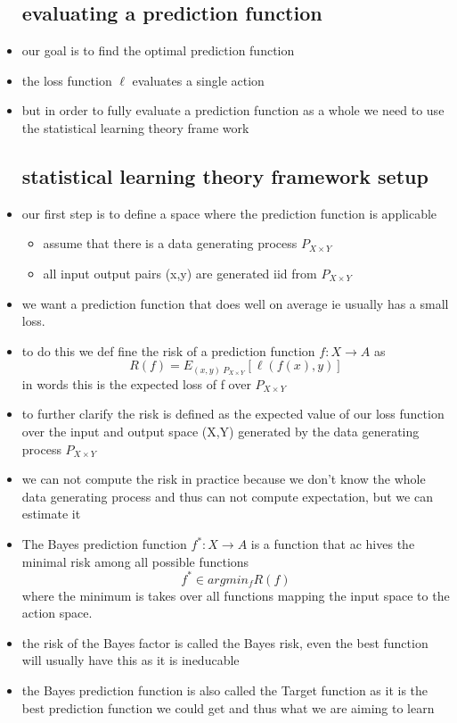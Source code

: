 \documentclass{article}
\begin{document}
\begin{itemize}
\subsection{evaluating a prediction function}
\item our goal is to find the optimal prediction function 
\item the loss function $\ell$ evaluates a single action 
\item but in order to fully evaluate a prediction function as a whole we need to use the statistical learning theory frame work 
\subsection{statistical learning theory framework setup}
\item our first step is to define a space where the prediction function is applicable
\begin{itemize}
    \item assume that there is a data generating process $P_{X\times Y}$ 
    \item all input output pairs (x,y) are generated iid from $P_{X\times Y}$ 
\end{itemize}
\item we want a prediction function that does well on average ie usually has a small loss.
\item to do this we def fine the risk of a prediction function $f:X\rightarrow A$ as $$R(f)=E_{(x,y)~P_{X\times Y}}[\ell (f(x),y)]$$ in words this is the expected loss of f over $P_{X\times Y}$
\item to further clarify the risk is defined as the expected value of our loss function over the input and output space (X,Y) generated by the data generating process $P_{X\times Y}$
\item we can not compute the risk in practice because we don't know the whole data generating process and thus can not compute expectation, but we can estimate it 
\item The Bayes prediction function $f^{*}:X\rightarrow A$ is a function that ac hives the minimal risk among all possible functions $$f^{*}\in argmin_{f}R(f)$$ where the minimum is takes over all functions mapping the input space to the action space. 
\item the risk of the Bayes factor is called the Bayes risk, even the best function will usually have this as it is ineducable 
\item the Bayes prediction function is also called the Target function as it is the best prediction function we could get and thus what we are aiming to learn 

\end{itemize}
\end{document}
